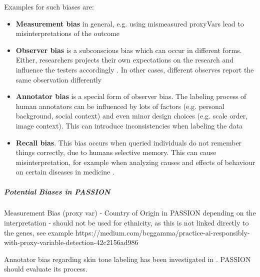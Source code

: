 \documentclass[12pt, a4paper, oneside]{book}   	%
\begin{document}
			Examples for such biases are:
			\begin{itemize}
				\item \textbf{Measurement bias} in general, e.g. using mismeasured \glspl{proxyVar} lead to misinterpretations of the outcome \autocite{Mehrabi_2021}
				
				\item \textbf{Observer bias} is a subconscious bias which can occur in different forms. Either, researchers projects their own expectations on the research and influence the testers accordingly \autocite{Mester_2022}. In other cases, different observes report the same observation differently \autocite{Chakraborty_2024, c29, c26}

				\item \textbf{Annotator bias} is a special form of observer bias. The labeling process of human annotators can be influenced by lots of factors (e.g. personal background, social context) and even minor design choices (e.g. scale order, image context). This can introduce inconsistencies when labeling the data \autocite{Montoya_2025}
				
				\item \textbf{Recall bias}. This bias occurs when queried individuals do not remember things correctly, due to humans selective memory. This can cause misinterpretation, for example when analyzing causes and effects of behaviour on certain diseases in medicine \autocites{Mester_2022}{Chakraborty_2024, c3-6, c2}.
			\end{itemize}
			
			\subparagraph{Potential Biases in PASSION}
			Measurement Bias (proxy var) - Country of Origin in PASSION depending on the interpretation - should not be used for ethnicity, as this is not linked directly to the genes, see example https://medium.com/bcggamma/practice-ai-responsibly-with-proxy-variable-detection-42c2156ad986
			
			Annotator bias regarding skin tone labeling has been investigated in \autocite{Montoya_2025}. PASSION should evaluate its process.
			
\end{document}

